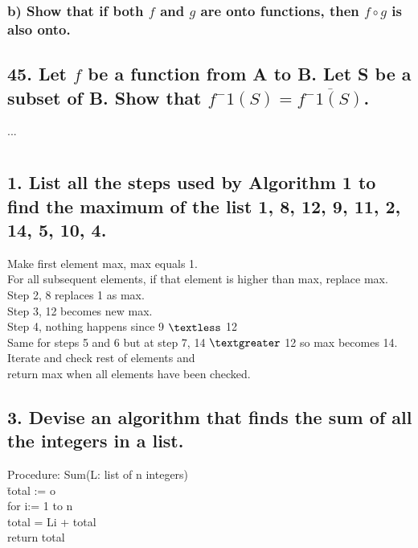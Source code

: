 \documentclass[11pt, oneside]{article} %
\numberwithin{equation}{section} %
\numberwithin{figure}{section} %
\numberwithin{table}{section} %
\begin{document}
\subsubsection{b) Show that if both $f$ and $g$ are onto functions, then $f\circ g$ is also onto.}

\subsection{45. Let $f$ be a function from A to B. Let S be a subset of B. Show that $f^-1(S)=\overline{f^-1(S)}$.}
...

\section{}
\subsection{1. List all the steps used by Algorithm 1 to find the maximum of the list 1, 8, 12, 9, 11, 2, 14, 5, 10, 4.}
Make first element max, max equals 1.\\
For all subsequent elements, if that element is higher than max, replace max.\\
Step 2, 8 replaces 1 as max. \\
Step 3, 12 becomes new max.\\
Step 4, nothing happens since 9 $\textless$ 12\\
Same for steps 5 and 6 but at step 7, 14 $\textgreater$ 12 so max becomes 14.\\
Iterate and check rest of elements and \\
return max when all elements have been checked.


\subsection{3. Devise an algorithm that finds the sum of all the integers in a list.}
\begin{tabbing}
Procedure: Sum(L: list of n integers) \\
\=  total := o \= \= \= \= \= \\
\> for i:= 1 to n\\
\> \> total = Li + total \\
\> return total
\end{tabbing}
\end{document}
